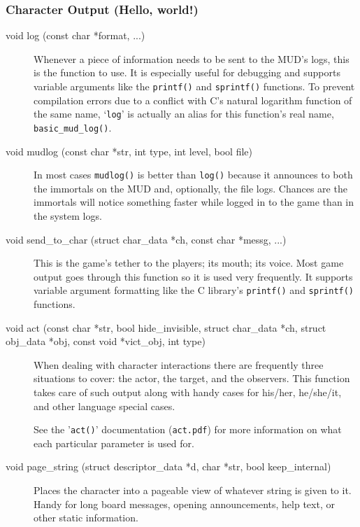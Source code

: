 \documentclass[11pt]{article}
\begin{document}
\subsubsection{Character Output (Hello, world!)}
\begin{description}
\item[void log (const char *format, ...)]
Whenever a piece of information needs to be sent to the MUD's logs, this is the function to use.  It is especially useful for debugging and supports variable arguments like the \texttt{printf()} and \texttt{sprintf()} functions.  To prevent compilation errors due to a conflict with C's natural logarithm function of the same name, `\texttt{log}' is actually an alias for this function's real name, \texttt{basic\_mud\_log()}.
\item[void mudlog (const char *str, int type, int level, bool file)]
In most cases \texttt{mudlog()} is better than \texttt{log()} because it announces to both the immortals on the MUD and, optionally, the file logs.  Chances are the immortals will notice something faster while logged in to the game than in the system logs.
\item[void send\_to\_char (struct char\_data *ch, const char *messg, ...)]
This is the game's tether to the players; its mouth; its voice.  Most game output goes through this function so it is used very frequently. It supports variable argument formatting like the C library's \texttt{printf()} and \texttt{sprintf()} functions.
\item[void act (const char *str, bool hide\_invisible, struct char\_data *ch, struct obj\_data *obj, const void *vict\_obj, int type)]
When dealing with character interactions there are frequently three situations to cover: the actor, the target, and the observers.  This function takes care of such output along with handy cases for his/her, he/she/it, and other language special cases.
\par
See the '\texttt{act()}' documentation (\texttt{act.pdf}) for more information on what each particular parameter is used for.
\item[void page\_string (struct descriptor\_data *d, char *str, bool keep\_internal)]
Places the character into a pageable view of whatever string is given to it.  Handy for long board messages, opening announcements, help text, or other static information.
\end{description}
\end{document}
